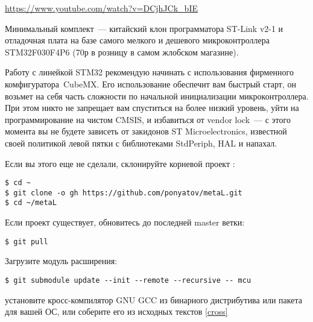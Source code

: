 \secdown

\url{https://www.youtube.com/watch?v=DCjhJCk_bIE}

\href{https://www.aliexpress.com/item/FREE-SHIPPING-ST-Link-V2-stlink-mini-STM8STM32-STLINK-simulator-download-programming-With-Cover/1814606455.html}{}
\href{https://www.aliexpress.com/item/48-MHz-STM32F030F4P6-Small-Systems-Development-Board-CORTEX-M0-Core-32bit-Mini-System-Development-Panels/32831635311.html}{}

\noindent
Минимальный комплект\ --- китайский клон программатора ST-Link v2-1 и отладочная
плата на базе самого мелкого и дешевого микроконтроллера STM32F030F4P6 (70р в
розницу в самом жлобском магазине).

\bigskip
Работу с линейкой STM32 рекомендую начинать с использования фирменного
комфигуратора\ CubeMX.
Его использование обеспечит вам быстрый старт, он возьмет на себя часть
сложности по начальной инициализации микроконтроллера. При этом никто не
запрещает вам спуститься на более низкий уровень, уйти на программирование на
чистом CMSIS, и избавиться от vendor lock\ --- с этого момента вы не будете
зависеть от закидонов ST Microelectronics, известной своей политикой левой пятки
с библиотеками StdPeriph, HAL и напахал.


\noindent
Если вы этого еще не сделали, склонируйте корневой проект \metal:

\begin{verbatim}
$ cd ~
$ git clone -o gh https://github.com/ponyatov/metaL.git
$ cd ~/metaL
\end{verbatim}
Если проект существует, обновитесь до последней master ветки:
\begin{verbatim}
$ git pull
\end{verbatim}
Загрузите модуль расширения:
\begin{verbatim}
$ git submodule update --init --remote --recursive -- mcu
\end{verbatim}
установите кросс-компилятор GNU GCC из бинарного дистрибутива или пакета для
вашей ОС, или соберите его из исходных текстов
\ref{cross}

